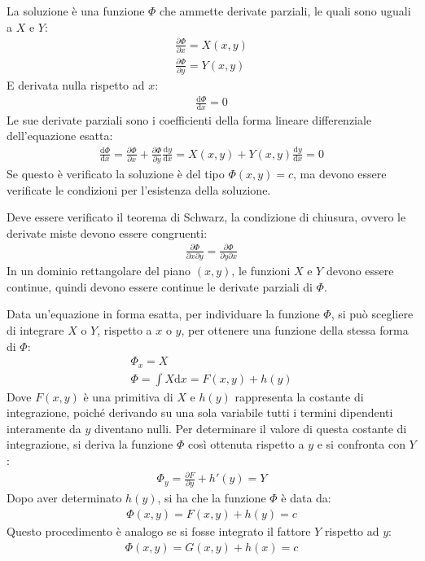 \documentclass{article}
\newcommand{\df}{\mathrm{d}}
\numberwithin{equation}{subsection}
\begin{document}
La soluzione è una funzione $\Phi$ che ammette derivate parziali, le quali sono uguali a $X$ e $Y$:
\begin{gather*}
    \displaystyle\frac{\partial\Phi}{\partial x}=X(x,y)\\
    \displaystyle\frac{\partial\Phi}{\partial y}=Y(x,y)
\end{gather*}
E derivata nulla rispetto ad $x$:
\begin{gather*}
    \displaystyle\frac{\df\Phi}{\df x}=0
\end{gather*}
Le sue derivate parziali sono i coefficienti della forma lineare differenziale dell'equazione esatta:
\begin{gather*}
    \displaystyle\frac{\df\Phi}{\df x}=\frac{\partial\Phi}{\partial x}+\frac{\partial\Phi}{\partial y}\frac{\df y}{\df x}=
    X(x,y)+Y(x,y)\frac{\df y}{\df x}=0
\end{gather*}
Se questo è verificato la soluzione è del tipo $\Phi(x,y)=c$, ma devono essere verificate le condizioni per l'esistenza della soluzione. 

Deve essere verificato il teorema di Schwarz, la condizione di chiusura, ovvero le derivate miste devono essere congruenti:
\begin{gather*}
    \displaystyle\frac{\partial\Phi}{\partial x\partial y}=\frac{\partial\Phi}{\partial y\partial x}
\end{gather*}
In un dominio rettangolare del piano $(x,y)$, le funzioni $X$ e $Y$ devono essere continue, quindi devono essere continue le derivate parziali di $\Phi$. 

Data un'equazione in forma esatta, per individuare la funzione $\Phi$, si può scegliere di integrare $X$ o $Y$, rispetto a $x$ o $y$, per ottenere una funzione della stessa forma di $\Phi$:
\begin{gather*}
    \Phi_x=X\\
    \Phi=\int X\df x =F(x,y)+h(y)
\end{gather*}
Dove $F(x,y)$ è una primitiva di $X$ e $h(y)$ rappresenta la costante di integrazione, poiché derivando su una sola variabile tutti i termini dipendenti interamente da $y$ diventano nulli. 
Per determinare il valore di questa costante di integrazione, si deriva la funzione $\Phi$ così ottenuta rispetto a $y$ e si confronta con $Y$:
\begin{gather*}
    \Phi_y=\frac{\partial F}{\partial y}+h'(y)=Y
\end{gather*}
Dopo aver determinato $h(y)$, si ha che la funzione $\Phi$ è data da:
\begin{gather}
    \Phi(x,y)=F(x,y)+h(y)=c
\end{gather}
Questo procedimento è analogo se si fosse integrato il fattore $Y$ rispetto ad $y$:
\begin{gather*}
    \Phi(x,y)=G(x,y)+h(x)=c
\end{gather*}
\end{document}
